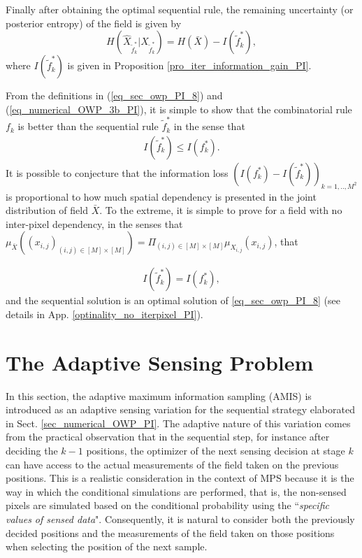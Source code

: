 Finally after obtaining the optimal sequential rule, the remaining uncertainty (or posterior entropy) of the field is given by
\begin{equation}\label{eq_numerical_OWP_5a_PI}
	H(\hat{X}_{\tilde{f}^*_k}| {X}_{\tilde{f}^*_k}) = H(\bar{X}) - I(\tilde{f}^*_k), 
\end{equation}
where $I(\tilde{f}^*_k)$ is given in Proposition \ref{pro_iter_information_gain_PI}. 
\begin{remark}\label{re_seq_vs_combinatorial_PI}
From the definitions in (\ref{eq_sec_owp_PI_8}) and (\ref{eq_numerical_OWP_3b_PI}), it is simple to show that the combinatorial rule $f_k$ is better than the sequential rule $\tilde{f}^*_k$ in the sense that
\begin{align}\label{eq_numerical_OWP_6_PI}
	I(\tilde{f}^*_k) \leq I({f}^*_k). 
\end{align}
It is possible to conjecture that the information loss $(I({f}^*_k)- I(\tilde{f}^*_k))_{k=1,..,M^2} $ is proportional to how much spatial dependency is presented in the joint distribution of field $\bar{X}$. To the extreme, it is simple to prove for a field with no inter-pixel dependency, in the senses that $\mu_{\bar{X}}((x_{i,j})_{(i,j) \in [M]\times [M]})=\Pi_{(i,j)\in [M]\times [M]} \mu_{X_{i,j}}(x_{i,j})$, that

\begin{align}\label{eq_numerical_OWP_7_PI}
	I(\tilde{f}^*_k)= I({f}^*_k),
\end{align}
and the sequential solution is an optimal solution of \eqref{eq_sec_owp_PI_8} (see details in App. \ref{optinality_no_iterpixel_PI}).
\end{remark}



\section{The Adaptive Sensing Problem}
\label{sec_adaptive_seq_sensing_PI}
In this section, the adaptive maximum information sampling (AMIS) is introduced as an adaptive sensing variation for the sequential strategy elaborated in Sect. \ref{sec_numerical_OWP_PI}. The adaptive nature of this variation comes from the practical observation that in the sequential step, for instance after deciding the $k-1$ positions, the optimizer of the next sensing decision at stage $k$ can have access to the actual measurements of the field taken on the previous positions. This is a realistic consideration in the context of MPS because it is the way in which the conditional simulations are performed, that is, the non-sensed pixels are simulated based on the conditional probability using the ``{\em specific values of sensed data}". Consequently, it is natural to consider both the previously decided positions and the measurements of the field taken on those positions when selecting the position of the next sample. 

